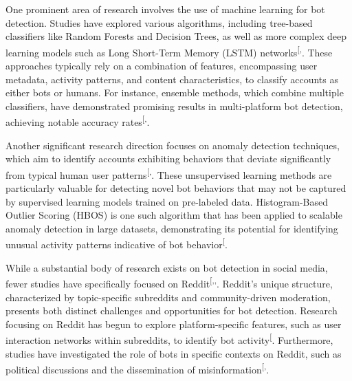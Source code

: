 \documentclass[
  12pt,
  letterpaper,
  DIV=11,
  numbers=noendperiod]{scrartcl}
\begin{document}
One prominent area of research involves the use of machine learning for
bot detection. Studies have explored various algorithms, including
tree-based classifiers like Random Forests and Decision Trees, as well
as more complex deep learning models such as Long Short-Term Memory
(LSTM)
networks\textsuperscript{{[},\citeproc{ref-evalsocialbotmodels}{5}{]}}.
These approaches typically rely on a combination of features,
encompassing user metadata, activity patterns, and content
characteristics, to classify accounts as either bots or humans. For
instance, ensemble methods, which combine multiple classifiers, have
demonstrated promising results in multi-platform bot detection,
achieving notable accuracy
rates\textsuperscript{{[},\citeproc{ref-multibotdetector}{4}{]}}.

Another significant research direction focuses on anomaly detection
techniques, which aim to identify accounts exhibiting behaviors that
deviate significantly from typical human user
patterns\textsuperscript{{[},\citeproc{ref-anomalyf5networks}{7}{]}}.
These unsupervised learning methods are particularly valuable for
detecting novel bot behaviors that may not be captured by supervised
learning models trained on pre-labeled data. Histogram-Based Outlier
Scoring (HBOS) is one such algorithm that has been applied to scalable
anomaly detection in large datasets, demonstrating its potential for
identifying unusual activity patterns indicative of bot
behavior\textsuperscript{{[}\citeproc{ref-anomalycloudflare}{6}{]}}.

While a substantial body of research exists on bot detection in social
media, fewer studies have specifically focused on
Reddit\textsuperscript{{[},,\citeproc{ref-mlredditbots}{9}{]}}.
Reddit's unique structure, characterized by topic-specific subreddits
and community-driven moderation, presents both distinct challenges and
opportunities for bot detection. Research focusing on Reddit has begun
to explore platform-specific features, such as user interaction networks
within subreddits, to identify bot
activity\textsuperscript{{[}\citeproc{ref-redditbotnetwork}{8}{]}}.
Furthermore, studies have investigated the role of bots in specific
contexts on Reddit, such as political discussions and the dissemination
of
misinformation\textsuperscript{{[},\citeproc{ref-multibotdetector}{4}{]}}.
\end{document}
